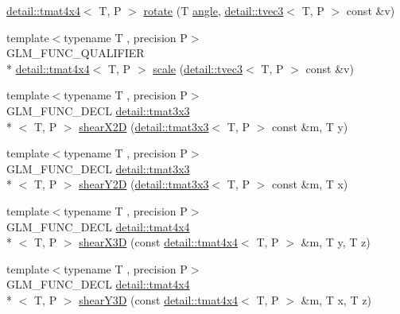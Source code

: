 \begin{DoxyCompactItemize}
\hyperlink{structglm_1_1detail_1_1tmat4x4}{detail\-::tmat4x4}$<$ T, P $>$ \hyperlink{group__gtx__transform_gaac4ccdbf699a62fe6429005512c0cda5}{rotate} (T \hyperlink{group__gtc__quaternion_ga23a3fc7ada5bbb665ff84c92c6e0542c}{angle}, \hyperlink{structglm_1_1detail_1_1tvec3}{detail\-::tvec3}$<$ T, P $>$ const \&v)
\item 
{\footnotesize template$<$typename T , precision P$>$ }\\G\-L\-M\-\_\-\-F\-U\-N\-C\-\_\-\-Q\-U\-A\-L\-I\-F\-I\-E\-R \\*
\hyperlink{structglm_1_1detail_1_1tmat4x4}{detail\-::tmat4x4}$<$ T, P $>$ \hyperlink{group__gtx__transform_ga80eb26a1eb382b7ab1e3631532d21103}{scale} (\hyperlink{structglm_1_1detail_1_1tvec3}{detail\-::tvec3}$<$ T, P $>$ const \&v)
\item 
{\footnotesize template$<$typename T , precision P$>$ }\\G\-L\-M\-\_\-\-F\-U\-N\-C\-\_\-\-D\-E\-C\-L \hyperlink{structglm_1_1detail_1_1tmat3x3}{detail\-::tmat3x3}\\*
$<$ T, P $>$ \hyperlink{group__gtx__transform2_gaa5a2d9216b3298b03252e549de6fd98a}{shear\-X2\-D} (\hyperlink{structglm_1_1detail_1_1tmat3x3}{detail\-::tmat3x3}$<$ T, P $>$ const \&m, T y)
\item 
{\footnotesize template$<$typename T , precision P$>$ }\\G\-L\-M\-\_\-\-F\-U\-N\-C\-\_\-\-D\-E\-C\-L \hyperlink{structglm_1_1detail_1_1tmat3x3}{detail\-::tmat3x3}\\*
$<$ T, P $>$ \hyperlink{group__gtx__transform2_ga1f5e68ada7a56cdf86c0c56d0b0a1832}{shear\-Y2\-D} (\hyperlink{structglm_1_1detail_1_1tmat3x3}{detail\-::tmat3x3}$<$ T, P $>$ const \&m, T x)
\item 
{\footnotesize template$<$typename T , precision P$>$ }\\G\-L\-M\-\_\-\-F\-U\-N\-C\-\_\-\-D\-E\-C\-L \hyperlink{structglm_1_1detail_1_1tmat4x4}{detail\-::tmat4x4}\\*
$<$ T, P $>$ \hyperlink{group__gtx__transform2_gaae5bbb490a3d798b083cbec0e0c2e94c}{shear\-X3\-D} (const \hyperlink{structglm_1_1detail_1_1tmat4x4}{detail\-::tmat4x4}$<$ T, P $>$ \&m, T y, T z)
\item 
{\footnotesize template$<$typename T , precision P$>$ }\\G\-L\-M\-\_\-\-F\-U\-N\-C\-\_\-\-D\-E\-C\-L \hyperlink{structglm_1_1detail_1_1tmat4x4}{detail\-::tmat4x4}\\*
$<$ T, P $>$ \hyperlink{group__gtx__transform2_ga4b5af90ecf76d312bb371f6111e1ae35}{shear\-Y3\-D} (const \hyperlink{structglm_1_1detail_1_1tmat4x4}{detail\-::tmat4x4}$<$ T, P $>$ \&m, T x, T z)

\end{DoxyCompactItemize}
